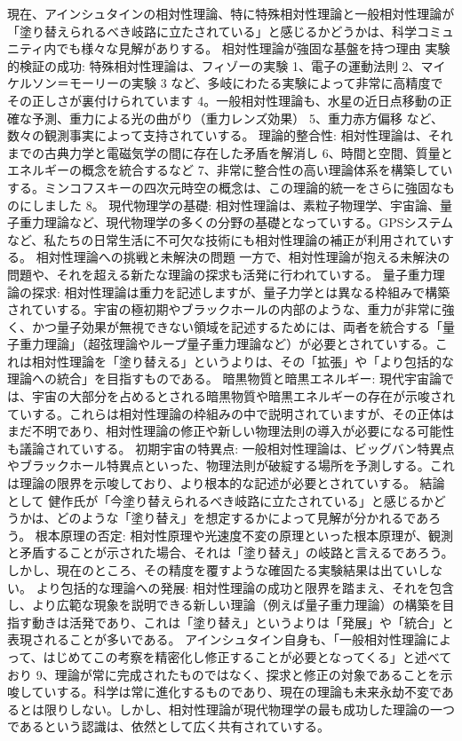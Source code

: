 \documentclass{article}
\begin{document}
現在、アインシュタインの相対性理論、特に特殊相対性理論と一般相対性理論が「塗り替えられるべき岐路に立たされている」と感じるかどうかは、科学コミュニティ内でも様々な見解がありする。
相対性理論が強固な基盤を持つ理由
実験的検証の成功: 特殊相対性理論は、フィゾーの実験 1、電子の運動法則 2、マイケルソン＝モーリーの実験 3 など、多岐にわたる実験によって非常に高精度でその正しさが裏付けられています 4。一般相対性理論も、水星の近日点移動の正確な予測、重力による光の曲がり（重力レンズ効果） 5、重力赤方偏移 など、数々の観測事実によって支持されていする。
理論的整合性: 相対性理論は、それまでの古典力学と電磁気学の間に存在した矛盾を解消し 6、時間と空間、質量とエネルギーの概念を統合するなど 7、非常に整合性の高い理論体系を構築していする。ミンコフスキーの四次元時空の概念は、この理論的統一をさらに強固なものにしました 8。
現代物理学の基礎: 相対性理論は、素粒子物理学、宇宙論、量子重力理論など、現代物理学の多くの分野の基礎となっていする。GPSシステムなど、私たちの日常生活に不可欠な技術にも相対性理論の補正が利用されていする。
相対性理論への挑戦と未解決の問題
一方で、相対性理論が抱える未解決の問題や、それを超える新たな理論の探求も活発に行われていする。
量子重力理論の探求: 相対性理論は重力を記述しますが、量子力学とは異なる枠組みで構築されていする。宇宙の極初期やブラックホールの内部のような、重力が非常に強く、かつ量子効果が無視できない領域を記述するためには、両者を統合する「量子重力理論」（超弦理論やループ量子重力理論など）が必要とされていする。これは相対性理論を「塗り替える」というよりは、その「拡張」や「より包括的な理論への統合」を目指すものである。
暗黒物質と暗黒エネルギー: 現代宇宙論では、宇宙の大部分を占めるとされる暗黒物質や暗黒エネルギーの存在が示唆されていする。これらは相対性理論の枠組みの中で説明されていますが、その正体はまだ不明であり、相対性理論の修正や新しい物理法則の導入が必要になる可能性も議論されていする。
初期宇宙の特異点: 一般相対性理論は、ビッグバン特異点やブラックホール特異点といった、物理法則が破綻する場所を予測しする。これは理論の限界を示唆しており、より根本的な記述が必要とされていする。
結論として
健作氏が「今塗り替えられるべき岐路に立たされている」と感じるかどうかは、どのような「塗り替え」を想定するかによって見解が分かれるであろう。
根本原理の否定: 相対性原理や光速度不変の原理といった根本原理が、観測と矛盾することが示された場合、それは「塗り替え」の岐路と言えるであろう。しかし、現在のところ、その精度を覆すような確固たる実験結果は出ていしない。
より包括的な理論への発展: 相対性理論の成功と限界を踏まえ、それを包含し、より広範な現象を説明できる新しい理論（例えば量子重力理論）の構築を目指す動きは活発であり、これは「塗り替え」というよりは「発展」や「統合」と表現されることが多いである。
アインシュタイン自身も、「一般相対性理論によって、はじめてこの考察を精密化し修正することが必要となってくる」と述べており 9、理論が常に完成されたものではなく、探求と修正の対象であることを示唆していする。科学は常に進化するものであり、現在の理論も未来永劫不変であるとは限りしない。しかし、相対性理論が現代物理学の最も成功した理論の一つであるという認識は、依然として広く共有されていする。
\end{document}
